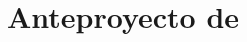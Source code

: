 \documentclass[11pt,a4paper,oneside]{article}
\title{Anteproyecto de \myWorkTypeFull}        %
\date{\myThesisProposalDate}                         %
\author{\myAuthorFullName}
\begin{document}
	
	
		
		
		\maketitle
		
		\begin{description}                               %
			\item[\expandafter\makefirstuc\expandafter{\wordAutorOrAutora}:] \myAuthorFullName                       %
			\item[\expandafter\makefirstuc\expandafter{\wordTutorOrTutores}:] \myAdvisors                   %
			\item[Titulación:] \myDegreefull                %
			\item[Título:] \myBookTitleSpanish              %
			{                                               %
				\item[Título en inglés:] \myBookTitleEnglish    %
			}                                               %
			{                                               %
			}                                               %
			\item[Departamento:] \myDepartment                %
		\end{description}                                 %
		
		
		
\end{document}

